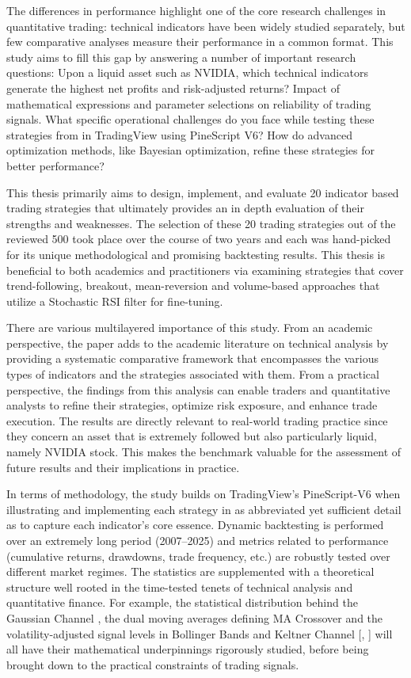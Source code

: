 The differences in performance highlight one of the core research challenges in quantitative trading: technical indicators have been widely studied separately, but few comparative analyses measure their performance in a common format. This study aims to fill this gap by answering a number of important research questions: Upon a liquid asset such as NVIDIA, which technical indicators generate the highest net profits and risk-adjusted returns? Impact of mathematical expressions and parameter selections on reliability of trading signals. What specific operational challenges do you face while testing these strategies from in TradingView using PineScript V6? How do advanced optimization methods, like Bayesian optimization, refine these strategies for better performance?

This thesis primarily aims to design, implement, and evaluate 20 indicator based trading strategies that ultimately provides an in depth evaluation of their strengths and weaknesses. The selection of these 20 trading strategies out of the reviewed 500 took place over the course of two years and each was hand-picked for its unique methodological and promising backtesting results. This thesis is beneficial to both academics and practitioners via examining strategies that cover trend-following, breakout, mean-reversion and volume-based approaches that utilize a Stochastic RSI filter for fine-tuning.

There are various multilayered importance of this study. From an academic perspective, the paper adds to the academic literature on technical analysis by providing a systematic comparative framework that encompasses the various types of indicators and the strategies associated with them. From a practical perspective, the findings from this analysis can enable traders and quantitative analysts to refine their strategies, optimize risk exposure, and enhance trade execution. The results are directly relevant to real-world trading practice since they concern an asset that is extremely followed but also particularly liquid, namely NVIDIA stock. This makes the benchmark valuable for the assessment of future results and their implications in practice.

In terms of methodology, the study builds on TradingView’s PineScript-V6 when illustrating and implementing each strategy in as abbreviated yet sufficient detail as to capture each indicator’s core essence. Dynamic backtesting is performed over an extremely long period (2007–2025) and metrics related to performance (cumulative returns, drawdowns, trade frequency, etc.) are robustly tested over different market regimes. The statistics are supplemented with a theoretical structure well rooted in the time-tested tenets of technical analysis and quantitative finance. For example, the statistical distribution behind the Gaussian Channel \cite{gaussian_channel_2022}, the dual moving averages defining MA Crossover \cite{macrossover_trend_2015} and the volatility-adjusted signal levels in Bollinger Bands and Keltner Channel [\cite{bollinger_bands_1991}, \cite{keltner_channel_2005}] will all have their mathematical underpinnings rigorously studied, before being brought down to the practical constraints of trading signals.

